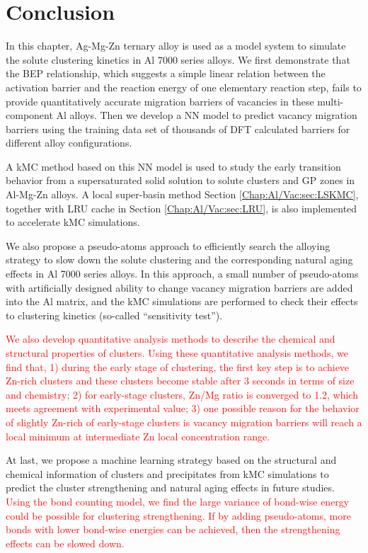 \section{Conclusion}
\label{Chap:Al/Vac:section:Conc}


In this chapter, Ag-Mg-Zn ternary alloy is used as a model system to simulate the solute clustering kinetics in Al 7000 series alloys. We first demonstrate that the \acf{BEP} relationship, which suggests a simple linear relation between the activation barrier and the reaction energy of one elementary reaction step, fails to provide quantitatively accurate migration barriers of vacancies in these multi-component Al alloys. Then we develop a \ac{NN} model to predict vacancy migration barriers using the training data set of thousands of \ac{DFT} calculated barriers for different alloy configurations. 

A \ac{kMC} method based on this \ac{NN} model is used to study the early transition behavior from a supersaturated solid solution to solute clusters and \acf{GP} zones in Al-Mg-Zn alloys. A local super-basin method  Section \ref{Chap:Al/Vac:sec:LSKMC}, together with \ac{LRU} cache in Section \ref{Chap:Al/Vac:sec:LRU}, is also implemented to accelerate \ac{kMC} simulations. 

We also propose a pseudo-atoms approach to efficiently search the alloying strategy to slow down the solute clustering and the corresponding natural aging effects in Al 7000 series alloys. In this approach, a small number of pseudo-atoms with artificially designed ability to change vacancy migration barriers are added into the Al matrix, and the \ac{kMC} simulations are performed to check their effects to clustering kinetics (so-called ``sensitivity test''). 

\textcolor{red}{We also develop quantitative analysis methods to describe the chemical and structural properties of clusters. Using these quantitative analysis methods, we find that, 1) during the early stage of clustering, the first key step is to achieve Zn-rich clusters and these clusters become stable after 3 seconds in terms of size and chemistry; 2) for early-stage clusters, Zn/Mg ratio is converged to 1.2, which meets agreement with experimental value; 3) one possible reason for the behavior of slightly Zn-rich of early-stage clusters is vacancy migration barriers will reach a local minimum at intermediate Zn local concentration range.} 

At last, we propose a machine learning strategy based on the structural and chemical information of clusters and precipitates from \ac{kMC} simulations to predict the cluster strengthening and natural aging effects in future studies. \textcolor{red}{Using the bond counting model, we find the large variance of bond-wise energy could be possible for clustering strengthening. If by adding pseudo-atoms, more bonds with lower bond-wise energies can be achieved, then the strengthening effects can be slowed down.}